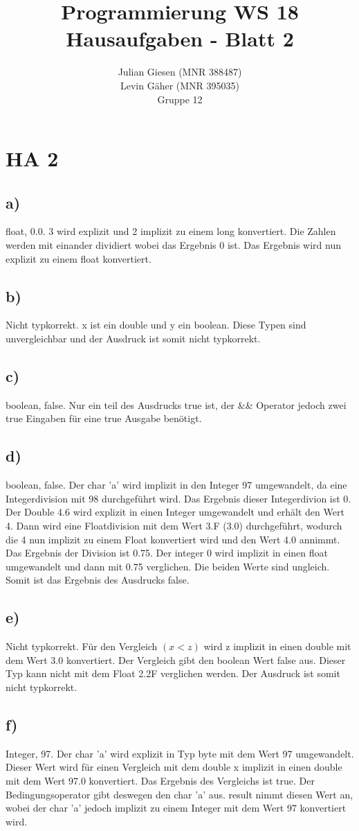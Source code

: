 \documentclass[a4paper]{article}
\title{ Programmierung WS 18 \\ Hausaufgaben - Blatt 2 }
\author{ Julian Giesen (MNR 388487) \\
Levin Gäher (MNR 395035) \\
Gruppe 12 }
\date{  }
\begin{document}
\maketitle

\section* { HA 2 }
\subsection*{ a) } 
float, 0.0. 3 wird explizit und 2 implizit zu einem long konvertiert. Die Zahlen werden mit einander dividiert wobei das Ergebnis 0 ist. Das Ergebnis wird nun explizit zu einem float konvertiert.
\subsection*{b)}
Nicht typkorrekt. x ist ein double und y ein boolean. Diese Typen sind unvergleichbar und der Ausdruck ist somit nicht typkorrekt.
\subsection*{c)}
boolean, false. Nur ein teil des Ausdrucks true ist, der \&\& Operator jedoch zwei true Eingaben für eine true Ausgabe benötigt.
\subsection*{d)}
boolean, false. Der char 'a' wird implizit in den Integer 97 umgewandelt, da eine Integerdivision mit 98 durchgeführt wird. Das Ergebnis dieser Integerdivion ist 0. Der Double 4.6 wird explizit in einen Integer umgewandelt und erhält den Wert 4. Dann wird eine Floatdivision mit dem Wert 3.F (3.0) durchgeführt, wodurch die 4 nun implizit zu einem Float konvertiert wird und den Wert 4.0 annimmt. Das Ergebnis der Division ist 0.75. Der integer 0 wird implizit in einen float umgewandelt und dann mit 0.75 verglichen. Die beiden Werte sind ungleich. Somit ist das Ergebnis des Ausdrucks false. 
\subsection*{e)}
Nicht typkorrekt. Für den Vergleich $(x < z)$ wird z implizit in einen double mit dem Wert 3.0 konvertiert. Der Vergleich gibt den boolean Wert false aus. Dieser Typ kann nicht mit dem Float 2.2F verglichen werden. Der Ausdruck ist somit nicht typkorrekt.
\subsection*{f)}
Integer, 97. Der char 'a' wird explizit in Typ byte mit dem Wert 97 umgewandelt. Dieser Wert wird für einen Vergleich mit dem double x implizit in einen double mit dem Wert 97.0 konvertiert. Das Ergebnis des Vergleichs ist true. Der Bedingungsoperator gibt deswegen den char 'a' aus. result nimmt diesen Wert an, wobei der char 'a' jedoch implizit zu einem Integer mit dem Wert 97 konvertiert wird.
\end{document}
